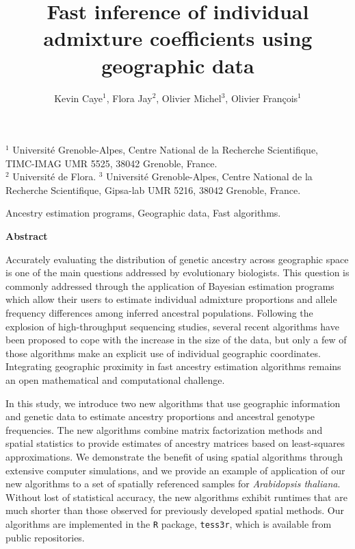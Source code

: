 \documentclass{article}
\begin{document}
\thispagestyle{empty}
\baselineskip 0.8cm

\title{Fast inference of individual admixture coefficients using geographic data}

\date{}

\author{Kevin Caye$^1$, Flora Jay$^2$, Olivier Michel$^3$, Olivier Fran\c cois$^1$}

\maketitle

\begin{center}
$^1$ Universit\'e Grenoble-Alpes, Centre National de la Recherche Scientifique, TIMC-IMAG UMR 5525, 38042 Grenoble, France.\\
$^2$ Universit\'e de Flora.
$^3$ Universit\'e Grenoble-Alpes, Centre National de la Recherche Scientifique, Gipsa-lab UMR 5216, 38042 Grenoble, France.
\end{center}


\vspace{2cm}

 Ancestry estimation programs, Geographic data, Fast algorithms.  

\clearpage
\newpage 


\linenumbers 

\begin{center}
{\bf Abstract}
\end{center}

Accurately evaluating the distribution of genetic ancestry across geographic space is one of the main questions addressed by evolutionary biologists. This question is commonly addressed through the application of Bayesian estimation programs which allow their users to estimate individual admixture proportions and allele frequency differences among inferred ancestral populations. Following the explosion of high-throughput sequencing studies, several recent algorithms have been proposed to cope with the increase in the size of the data, but only a few of those algorithms make an explicit use of individual geographic coordinates. Integrating geographic proximity in fast ancestry estimation algorithms remains an open mathematical and computational challenge. 

In this study, we introduce two new algorithms that use geographic information and genetic data to estimate ancestry proportions and ancestral genotype frequencies. The new algorithms combine matrix factorization methods and spatial statistics to provide estimates of ancestry matrices based on least-squares approximations.  We demonstrate the benefit of using spatial algorithms through extensive computer simulations, and we provide an example of application of our new algorithms to a set of spatially referenced samples for {\it Arabidopsis thaliana}.  Without lost of statistical accuracy, the new algorithms exhibit runtimes that are much shorter than those observed for previously developed spatial methods. Our algorithms are implemented in the {\tt R} package, {\tt tess3r}, which is available from public repositories. 
 
\end{document}
